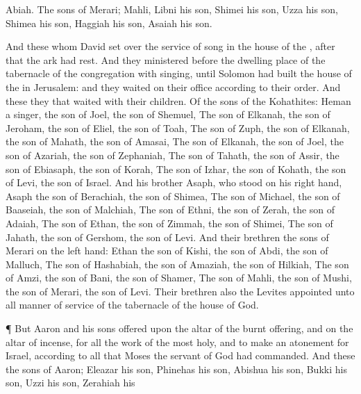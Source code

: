 {Abiah.
The
sons of
Merari;
Mahli,
Libni his
son,
Shimei his
son,
Uzza his
son,
Shimea his
son,
Haggiah his
son,
Asaiah his
son.
\par }{\PP {}And these
{} whom
David
set over the
service of
song in the
house of the
{}, after that the
ark had
rest.
And they
ministered
before the
dwelling place of the
tabernacle of the
congregation with
singing, until
Solomon had
built the
house of the
{} in
Jerusalem: and
{} they
waited on their
office according to their
order.
And these
{} they that
waited with their
children. Of the
sons of the
Kohathites:
Heman a
singer, the
son of
Joel, the
son of
Shemuel,
The
son of
Elkanah, the
son of
Jeroham, the
son of
Eliel, the
son of
Toah,
The
son of
Zuph, the
son of
Elkanah, the
son of
Mahath, the
son of
Amasai,
The
son of
Elkanah, the
son of
Joel, the
son of
Azariah, the
son of
Zephaniah,
The
son of
Tahath, the
son of
Assir, the
son of
Ebiasaph, the
son of
Korah,
The
son of
Izhar, the
son of
Kohath, the
son of
Levi, the
son of
Israel.
And his
brother
Asaph, who
stood on his right
hand,
{}
Asaph the
son of
Berachiah, the
son of
Shimea,
The
son of
Michael, the
son of
Baaseiah, the
son of
Malchiah,
The
son of
Ethni, the
son of
Zerah, the
son of
Adaiah,
The
son of
Ethan, the
son of
Zimmah, the
son of
Shimei,
The
son of
Jahath, the
son of
Gershom, the
son of
Levi.
And their
brethren the
sons of
Merari
{} on the left
hand:
Ethan the
son of
Kishi, the
son of
Abdi, the
son of
Malluch,
The
son of
Hashabiah, the
son of
Amaziah, the
son of
Hilkiah,
The
son of
Amzi, the
son of
Bani, the
son of
Shamer,
The
son of
Mahli, the
son of
Mushi, the
son of
Merari, the
son of
Levi.
Their
brethren also the
Levites
{}
appointed unto all manner of
service of the
tabernacle of the
house of
God.
\par }{\PP {}¶ But
Aaron and his
sons
offered upon the
altar of the burnt
offering, and on the
altar of
incense,
{} for all the
work of the
{}
most
holy, and to make an
atonement for
Israel, according to all that
Moses the
servant of
God had
commanded.
And these
{} the
sons of
Aaron;
Eleazar his
son,
Phinehas his
son,
Abishua his
son,
Bukki his
son,
Uzzi his
son,
Zerahiah his
}
